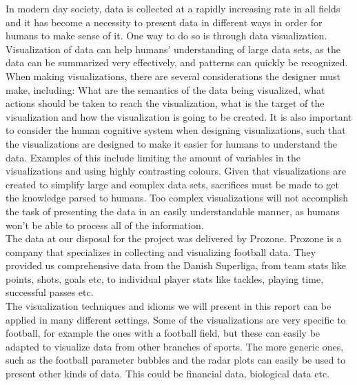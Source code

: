 \documentclass[Report.tex]{subfiles}
\begin{document}
In modern day society, data is collected at a rapidly increasing rate in all fields and it has become a necessity to present data in different ways in order for humans to make sense of it. One way to do so is through data visualization. Visualization of data can help humans' understanding of large data sets, as the data can be summarized very effectively, and patterns can quickly be recognized. When making visualizations, there are several considerations the designer must make, including: What are the semantics of the data being visualized, what actions should be taken to reach the visualization, what is the target of the visualization and how the visualization is going to be created. It is also important to consider the human cognitive system when designing visualizations, such that the visualizations are designed to make it easier for humans to understand the data. Examples of this include limiting the amount of variables in the visualizations and using highly contrasting colours. Given that visualizations are created to simplify large and complex data sets, sacrifices must be made to get the knowledge parsed to humans. Too complex visualizations will not accomplish the task of presenting the data in an easily understandable manner, as humans won’t be able to process all of the information.
\\

The data at our disposal for the project was delivered by Prozone. Prozone is a company that specializes in collecting and visualizing football data. They provided us  comprehensive data from the Danish Superliga, from team stats like points, shots, goals etc, to individual player stats like tackles, playing time, successful passes etc.
\\

The visualization techniques and idioms we will present in this report can be applied in many different settings. Some of the visualizations are very specific to football, for example the ones with a football field, but these can easily be adapted to visualize data from other branches of sports. The more generic ones, such as the football parameter bubbles and the radar plots can easily be used to present other kinds of data. This could be financial data, biological data etc. 
\end{document}
